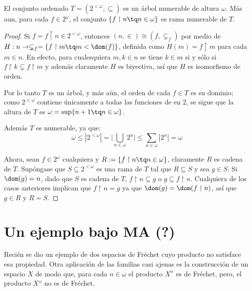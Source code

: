 
\begin{lema}
	El conjunto ordenado $T=(2^{<\omega}, \subseteq)$ es un árbol numerable de altura $\omega$. Más aun, para cada $f \in 2^\omega$, el conjunto $\{ f \upharpoonright n \tq n \in \omega \}$ es rama numerable de $T$.
\end{lema}

\begin{proof}
	Si $f=f \upharpoonright n \in 2^{<\omega}$, entonces $(n,\in) \cong (f, \subsetneq_f)$ por medio de $H:n \to \subsetneq_f=\{ f \upharpoonright m \tq m < \dom(f) \}$, definida como $H(m)=f \upharpoonright m$ para cada $m \in n$. En efecto, para cualesquiera $m,k \in n$ se tiene $k \in m$ si y sólo si $f \upharpoonright k \subsetneq f \upharpoonright m$ y además claramente $H$ es biyectiva, así que $H$ es isomorfismo de orden.

	Por lo tanto $T$ es un árbol, y más aún, el orden de cada $f \in T$ es su dominio; como $2^{<\omega}$ contiene únicamente a todas las funciones de en $2$, se sigue que la altura de $T$ es $\omega = \sup\{ n+1 \tq n \in \omega \}$.

	Además $T$ es numerable, ya que:
	$$ \omega \leq |2^{<\omega}| = \Big| \bigcup_{n \in \omega} 2^n \Big| \leq \sum_{n \in \omega} |2^n| = \omega $$

	Ahora, sean $f \in 2^\omega$ cualquiera y $R:=\{ f \upharpoonright n \tq n \in \omega \}$, claramente $R$ es cadena de $T$. Supóngase que $S \subseteq 2^{<\omega}$ es una rama de $T$ tal que $R \subseteq S$ y sea $g \in S$. Si $\dom(g)=n$, dado que $S$ es cadena de $T$, $f \upharpoonright n \subseteq g$ o $g \subseteq f \upharpoonright n$. Cualquiera de los casos anteriores implican que $f \upharpoonright n = g$ ya que $\dom(g)=\dom(f \upharpoonright n)$, así que $g \in R$ y $R = S$.
\end{proof}


\newpage

\section{Un ejemplo bajo MA (?)}

Recién se dio un ejemplo de dos espacios de Fréchet cuyo producto no satisface esa propiedad. Otra aplicación de las familias casi ajenas es la construcción de un espacio $X$ de modo que, para cada $n \in \omega$ el producto $X^n$ es de Fréchet, pero, el producto $X^\omega$ no es de Fréchet.

